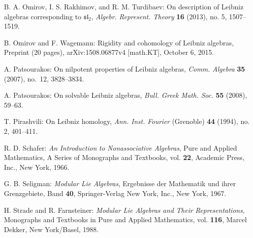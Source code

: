 \documentclass{amsart}
\numberwithin{equation}{section}
\newcommand{\slf}{\mathfrak{sl}}
\begin{document}
\begin{thebibliography}{99}
B. A. Omirov, I. S. Rakhimov, and R. M. Turdibaev:
On description of Leibniz algebras corresponding to $\slf_2$,
{\it Algebr. Represent. Theory\/} {\bf 16} (2013), no. 5, 1507--1519.

B. Omirov and F. Wagemann:
Rigidity and cohomology of Leibniz algebras,
Preprint (20 pages), arXiv:1508.06877v4 [math.KT], October 6, 2015.

A. Patsourakos:
On nilpotent properties of Leibniz algebras,
{\it Comm. Algebra\/} {\bf 35} (2007), no.~12, 3828--3834.

A. Patsourakos:
On solvable Leibniz algebras,
{\it Bull. Greek Math. Soc.\/} {\bf 55} (2008), 59--63.

T. Pirashvili: On Leibniz homology,
{\it Ann. Inst. Fourier\/} (Grenoble) {\bf 44} (1994), no. 2, 401--411.

R. D. Schafer:
{\it An Introduction to Nonassociative Algebras\/},
Pure and Applied Mathematics, A Series of Monographs and Textbooks, vol. {\bf 22},
Academic Press, Inc., New York, 1966.

G. B. Seligman:
{\it Modular Lie Algebras\/},
Ergebnisse der Mathematik und ihrer Grenzgebiete, Band {\bf 40},
Springer-Verlag New York, Inc., New York, 1967.

H. Strade and R. Farnsteiner: 
{\it Modular Lie Algebras and Their Representations\/}, 
Monographs and Textbooks in Pure and Applied Mathematics, vol. {\bf 116}, 
Marcel Dekker, New York/Basel, 1988.


\end{thebibliography}

\end{document}
